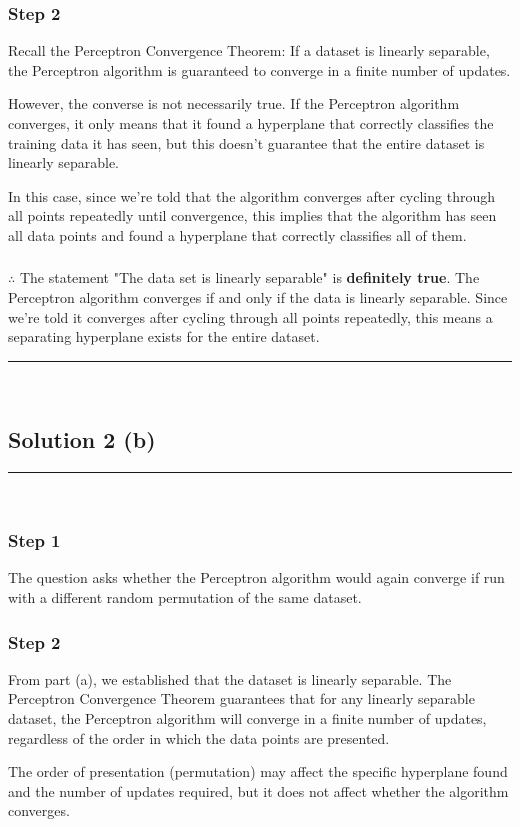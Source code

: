 \documentclass{article}
\begin{document}
\subsubsection*{Step 2}
\parbox{\textwidth}{
Recall the Perceptron Convergence Theorem: If a dataset is linearly separable, the Perceptron algorithm is guaranteed to converge in a finite number of updates.

However, the converse is not necessarily true. If the Perceptron algorithm converges, it only means that it found a hyperplane that correctly classifies the training data it has seen, but this doesn't guarantee that the entire dataset is linearly separable.

In this case, since we're told that the algorithm converges after cycling through all points repeatedly until convergence, this implies that the algorithm has seen all data points and found a hyperplane that correctly classifies all of them.
}

\subsubsection*{\normalfont}{$\therefore$ The statement "The data set is linearly separable" is \textbf{definitely true}. The Perceptron algorithm converges if and only if the data is linearly separable. Since we're told it converges after cycling through all points repeatedly, this means a separating hyperplane exists for the entire dataset.}

\noindent\rule{\textwidth}{0.4pt}\\

\newpage

\subsection*{Solution 2 (b)}
\noindent\rule{\textwidth}{0.4pt}\\

\subsubsection*{Step 1}
\parbox{\textwidth}{
The question asks whether the Perceptron algorithm would again converge if run with a different random permutation of the same dataset.
}

\subsubsection*{Step 2}
\parbox{\textwidth}{
From part (a), we established that the dataset is linearly separable. The Perceptron Convergence Theorem guarantees that for any linearly separable dataset, the Perceptron algorithm will converge in a finite number of updates, regardless of the order in which the data points are presented.

The order of presentation (permutation) may affect the specific hyperplane found and the number of updates required, but it does not affect whether the algorithm converges.
}
\end{document}
